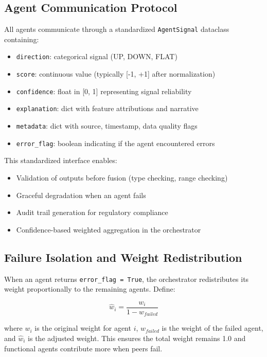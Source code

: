 \documentclass[conference]{IEEEtran}
\begin{document}
\subsection{Agent Communication Protocol}

All agents communicate through a standardized \texttt{AgentSignal} dataclass containing:
\begin{itemize}
\item \texttt{direction}: categorical signal (UP, DOWN, FLAT)
\item \texttt{score}: continuous value (typically [-1, +1] after normalization)
\item \texttt{confidence}: float in [0, 1] representing signal reliability
\item \texttt{explanation}: dict with feature attributions and narrative
\item \texttt{metadata}: dict with source, timestamp, data quality flags
\item \texttt{error\_flag}: boolean indicating if the agent encountered errors
\end{itemize}

This standardized interface enables:
\begin{itemize}
\item Validation of outputs before fusion (type checking, range checking)
\item Graceful degradation when an agent fails
\item Audit trail generation for regulatory compliance
\item Confidence-based weighted aggregation in the orchestrator
\end{itemize}

\subsection{Failure Isolation and Weight Redistribution}

When an agent returns \texttt{error\_flag = True}, the orchestrator redistributes its weight proportionally to the remaining agents. Define:

\begin{equation}
\hat{w}_i = \frac{w_i}{1 - w_{failed}}
\label{eq:weight_redistribution}
\end{equation}

where $w_i$ is the original weight for agent $i$, $w_{failed}$ is the weight of the failed agent, and $\hat{w}_i$ is the adjusted weight. This ensures the total weight remains 1.0 and functional agents contribute more when peers fail.
\end{document}
